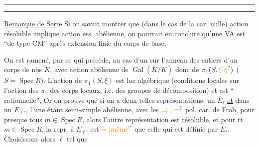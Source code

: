 \par\noindent\rule{.45\linewidth}{.4pt}\par\noindent\rule{.42\linewidth}{.4pt}\par

\uline{Remarque de Serre} Si on savait montrer que (dans le cas de la car. nulle) action résoluble implique action ess. abélienne,  on pourrait en conclure qu'une  VA est ``de type CM'' après extension finie du corps de base.

On est ramené, par ce qui précède, au cas d'un   sur l'anneau des entiers  d'un corps de nbs $K$, avec action abélienne de $\operatorname{Gal}(\bar K/K)$ donc de $\pi_1(S,\unsure{\xi|\eta})$ ($S=\operatorname{Spec}R$). L'action de $\pi_1(S,\xi)$  est loc algébrique  (conditions locales sur l'action des $\pi_1$ des corps locaux, i.e. des groupes de décomposition) et est `` rationnelle'',   Or on prouve que si on a deux telles représentations,  un $E_\ell$ \uline{et}
dans un $E_{\ell'}$, l'une étant semi-simple abélienne,   avec les $\unsure{\rightrightarrows|=}$ pol. car. de Frob, pour presque tous $m\in\operatorname{Spec}R$, alors l'autre représentation est \uline{résoluble},
et pour tt $m\in\operatorname{Spec}R$, la repr.   à $E_{\ell'}$    est  $\unsure{=|\text{même}}$ que celle qui est définie par $E_\ell$. Choisissons alors $\ell$ tel que


